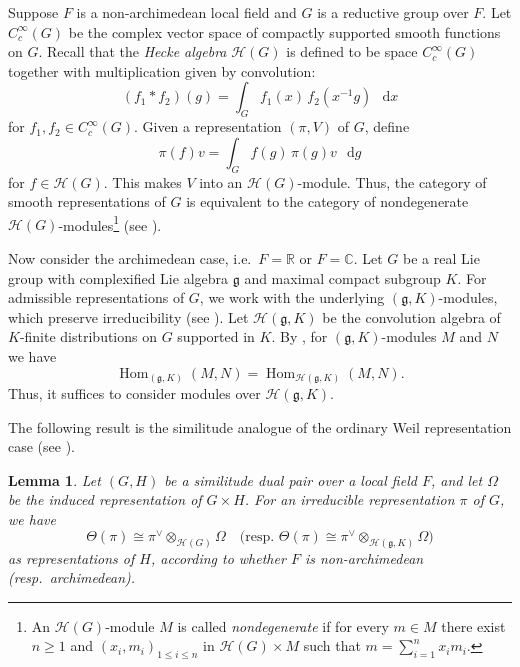 \documentclass[11pt]{article}
\theoremstyle{plain}
\newtheorem{lemma}[theorem]{Lemma}
\theoremstyle{remark}
\theoremstyle{definition}
\newcommand*\dd{\mathop{}\!\mathrm{d}}
\DeclareMathOperator{\Hom}{Hom}
\begin{document}
Suppose $F$ is a non-archimedean local field and $G$ is a reductive group over $F$.
Let $C_c^{\infty}(G)$ be the complex vector space of compactly supported smooth functions on $G$.
Recall that the \emph{Hecke algebra} $\mathcal{H}(G)$ is defined to be space $C_c^{\infty}(G)$ together with multiplication given by convolution:
\[
(f_1*f_2)(g)=\int_G f_1(x)\,f_2(x^{-1}g)\,\dd x
\]
for $f_1,f_2\in C_c^{\infty}(G)$.
Given a representation $(\pi,V)$ of $G$, define
\[
\pi(f)v=\int_G f(g)\,\pi(g)v\,\dd g
\]
for $f\in \mathcal{H}(G)$.
This makes $V$ into an $\mathcal{H}(G)$-module.
Thus, the category of smooth representations of $G$ is equivalent to the category of nondegenerate $\mathcal{H}(G)$-modules\footnote{An $\mathcal{H}(G)$-module $M$ is called \emph{nondegenerate} if for every $m\in M$ there exist $n\ge 1$ and $(x_i,m_i)_{1\le i\le n}$ in $\mathcal{H}(G)\times M$ such that $m=\sum_{i=1}^{n}x_{i}m_{i}$.} (see \cite[Lemma~5.3.3]{GetzHahn}).

Now consider the archimedean case, i.e.\ $F=\mathbb{R}$ or $F=\mathbb{C}$.
Let $G$ be a real Lie group with complexified Lie algebra $\mathfrak{g}$ and maximal compact subgroup $K$.
For admissible representations of $G$, we work with the underlying $(\mathfrak{g},K)$-modules, which preserve irreducibility (see \cite[\S 3.4]{Wal}).
Let $\mathcal{H}(\mathfrak{g},K)$ be the convolution algebra of $K$-finite distributions on $G$ supported in $K$.
By \cite[Chapter~I.4, Theorem]{KnVo1995}, for $(\mathfrak{g},K)$-modules $M$ and $N$ we have
\[
\Hom_{(\mathfrak{g},K)}(M,N)=\Hom_{\mathcal{H}(\mathfrak{g},K)}(M,N).
\]
Thus, it suffices to consider modules over $\mathcal{H}(\mathfrak{g},K)$.

The following result is the similitude analogue of the ordinary Weil representation case (see \cite[Theorems~3--4]{LokePrze2024}).
\begin{lemma}\label{ltenHsim}
Let $(G,H)$ be a similitude dual pair over a local field $F$, and let $\Omega$ be the induced representation of $G\times H$.
For an irreducible representation $\pi$ of $G$, we have
\[
\Theta(\pi)\cong\pi^{\vee}\otimes_{\mathcal{H}(G)}\Omega
\quad \text{(resp.\ } \Theta(\pi)\cong\pi^{\vee}\otimes_{\mathcal{H}(\mathfrak{g},K)}\Omega\text{)}
\]
as representations of $H$, according to whether $F$ is non-archimedean (resp.\ archimedean).
\end{lemma}
\end{document}
